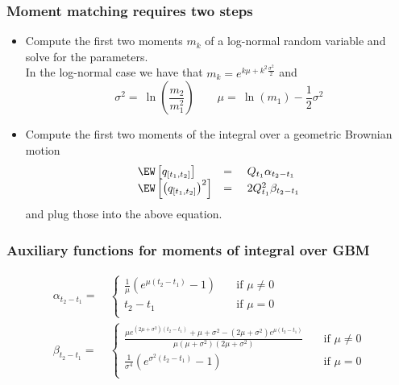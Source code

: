 \begin{frame}
  \frametitle{Moment matching requires two steps}
    \begin{itemize}
   \item<1-> Compute the first two moments $m_k$ of a log-normal random variable and solve for the parameters. \\
     In the log-normal case we have that $m_k = e^{k\mu + k^2 \frac{\sigma^2}{2}}$ and
     $$
     \sigma^2 = \ \ln\left( \frac{m_2}{m^2_1}\right)  \qquad \mu = \ \ln(m_1) - \frac{1}{2}  \sigma^2
     $$
    \item<2-> Compute the first two moments of the integral over a geometric Brownian motion
    $$\begin{array}{lll}
\EW \left[ q_{[t_1,t_2]} \right] &=& \ Q_{t_1} \alpha_{t_2-t_1} \\
\EW \left[ \left( q_{[t_1,t_2]} \right)^2 \right] &=& \ 2 Q_{t_1}^2 \beta_{t_2-t_1}
\end{array}
$$
    and plug those into the above equation.
    \end{itemize}
\end{frame}

\begin{frame}
  \frametitle{Auxiliary functions for moments of integral over GBM}
\begin{align}
\alpha_{t_2-t_1}    =& \ \left\{
         \begin{array}{ll}
            \frac{1}{\mu} \left( e^{\mu \left( t_2 - t_1 \right)} - 1 \right)
            & \quad \mbox{if $\mu \ne 0$} \\
            t_2 - t_1
            & \quad \mbox{if $\mu = 0$} \\
         \end{array} \right. \label{MomIntAlpha} \\
\beta_{t_2-t_1}    =& \ \left\{
         \begin{array}{ll}
            \frac{ \mu e^{(2 \mu + \sigma^2) \left( t_2 - t_1 \right)} + \mu + \sigma^2 - \left( 2\mu + \sigma^2\right) e^{\mu \left( t_2 - t_1 \right)}}{\mu(\mu + \sigma^2)(2\mu + \sigma^2)}
            & \quad \mbox{if $\mu \ne 0$} \\
            \frac{1}{\sigma^4} \left( e^{\sigma^2\left(t_2-t_1\right)} - 1\right)
            & \quad \mbox{if $\mu = 0$} \\
         \end{array} \right. \label{MomIntBeta}
\end{align}
\end{frame}

